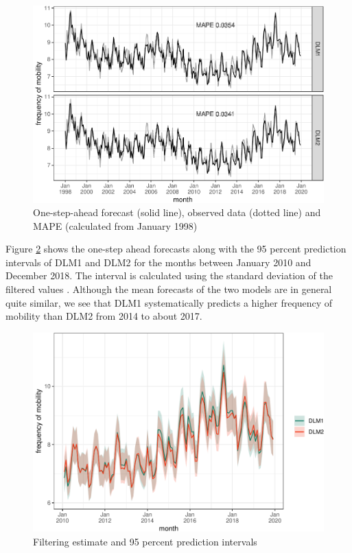 \documentclass[12pt, a4paper]{article}
\begin{document}
\begin{figure}[H]
 \caption{\label{fig:dlm-filtered}One-step-ahead forecast (solid line),
observed data (dotted line) and MAPE (calculated from January 1998)}
\centering
\includegraphics[scale = 0.8]{../figs/freq--dlm-filtered-1.pdf}
\end{figure}

Figure \ref{fig:ci-comparison} shows the one-step ahead forecasts
along with the 95 percent prediction intervals of DLM1 and DLM2 for the
months between January 2010 and December 2018. The interval is
calculated using the standard deviation of the filtered values
\citep[ch.~3]{petris2009dynamic}. Although the mean forecasts of the two models are in general quite similar, we see that DLM1 systematically predicts a higher frequency of mobility than DLM2 from 2014 to about 2017.

\begin{figure}[H]
\caption{\label{fig:ci-comparison}Filtering estimate and 95 percent
prediction intervals}
  \centering
\includegraphics[scale = 0.8]{../figs/freq--ci-comparison-1.pdf}
\end{figure}
\end{document}
